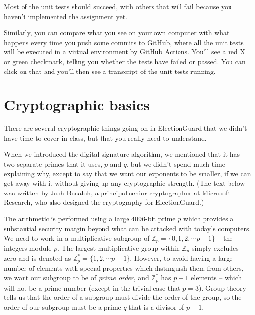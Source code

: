 
Most of the unit tests should succeed, with others that will fail because you haven't
implemented the assignment yet.

Similarly, you can compare what you see on your own computer with
what happens every time you push some commits to GitHub, where all
the unit tests will be executed in a virtual environment
by GitHub Actions. You'll see a red X or green checkmark, telling you
whether the tests have failed or passed. You can click on that
and you'll then see a transcript of the unit tests running.

\section{Cryptographic basics}
There are several cryptographic things going on in ElectionGuard that
we didn't have time to cover in class, but that you really need to
understand.

When we introduced the digital signature algorithm, we mentioned that
it has two separate primes that it uses, $p$ and $q$, but we didn't
spend much time explaining why, except to say that we want our
exponents to be smaller, if we can get away with it without giving up
any cryptographic strength. (The text below was written by 
Josh Benaloh, a principal senior cryptographer at Microsoft Research,
who also designed the cryptography for ElectionGuard.)

The arithmetic is performed using a large 4096-bit prime $p$ which
provides a substantial security margin beyond what can be attacked
with today's computers.  We need to work in a multiplicative subgroup of
$\mathbb{Z}_p=\{0, 1, 2, \cdots p-1\}$ -- the
integers modulo $p$.  The largest multiplicative group within
$\mathbb{Z}_p$ simply excludes zero and is denoted as
$\mathbb{Z}_p^*=\{1, 2, \cdots p-1\}$.  However, to avoid having a
large number of elements with special properties which distinguish
them from others, we want our subgroup to be of {\em prime order}, and
$\mathbb{Z}_p^*$ has $p-1$ elements – which will not be a prime number
(except in the trivial case that $p=3$). Group theory tells us that
the order of a subgroup must divide the order of the group, so the
order of our subgroup must be a prime $q$ that is a divisor of $p-1$.

